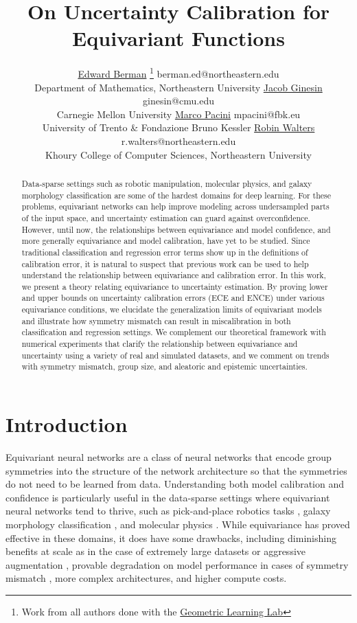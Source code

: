 \documentclass[10pt]{article} %
\title{On Uncertainty Calibration for Equivariant Functions}
\author{\name \href{https://ebrmn.space/}{Edward Berman} \thanks{Work from all authors done with the \href{https://www.robinwalters.com/}{Geometric Learning Lab}} \footnotetext[1]{} \email berman.ed@northeastern.edu \\
      \addr Department of Mathematics, Northeastern University
      \AND
      \name \href{https://jakegines.in/}{Jacob Ginesin}  \email ginesin@cmu.edu \\
      \addr Carnegie Mellon University
            \AND
      \name \href{https://marco-pacini.github.io/}{Marco Pacini}  \email mpacini@fbk.eu \\
      \addr University of Trento \& Fondazione Bruno Kessler
      \AND
      \name \href{https://www.robinwalters.com/}{Robin Walters}  \email r.walters@northeastern.edu\\
      \addr Khoury College of Computer Sciences, Northeastern University
      }
\theoremstyle{definition}
\begin{document}
\maketitle

\begin{abstract}
Data-sparse settings such as robotic manipulation, molecular physics, and galaxy morphology classification are some of the hardest domains for deep learning. For these problems, equivariant networks can help improve modeling across undersampled parts of the input space, and uncertainty estimation can guard against overconfidence. However, until now, the relationships between equivariance and model confidence, and more generally equivariance and model calibration, have yet to be studied. Since traditional classification and regression error terms show up in the definitions of calibration error, it is natural to suspect that previous work can be used to help understand the relationship between equivariance and calibration error. In this work, we present a theory relating equivariance to uncertainty estimation. By proving lower and upper bounds on uncertainty calibration errors (ECE and ENCE) under various equivariance conditions, we elucidate the generalization limits of equivariant models and illustrate how symmetry mismatch can result in miscalibration in both classification and regression settings. We complement our theoretical framework with numerical experiments that clarify the relationship between equivariance and uncertainty using a variety of real and simulated datasets, and we comment on trends with symmetry mismatch, group size, and aleatoric and epistemic uncertainties. %
\end{abstract}




\section{Introduction} 

Equivariant neural networks are a class of neural networks that encode group symmetries into the structure of the network architecture so that the symmetries do not need to be learned from data. Understanding both model calibration and confidence is particularly useful in the data-sparse settings where equivariant neural networks tend to thrive, such as pick-and-place robotics tasks \citep{kalashnikov1806qt, wang2022equivariant, wang2022robot, fu2023neuse, huang2023edge, huang2024leveraging, huang2024fourier, dian_thesis}, galaxy morphology classification \citep{pandya20232, sneh_mlst}, and molecular physics \citep{zou2023deep, ramakrishnan2014quantum}. While equivariance has proved effective in these domains, it does have some drawbacks, including diminishing benefits at scale as in the case of extremely large datasets or aggressive augmentation \citep{wangswallowing, klee2023comparison, gruver2023the, brehmer2024does, abramson2024accurate}, provable degradation on model performance in cases of symmetry mismatch \citep{wang2024general}, more complex architectures, and higher compute costs.
\end{document}
